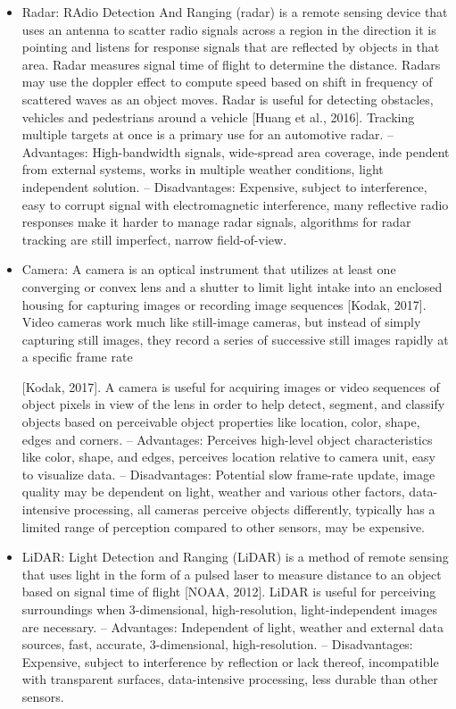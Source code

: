 \begin{itemize}
\item Radar: RAdio Detection And Ranging (radar) is a remote sensing device that uses an antenna to scatter radio signals across a region in the direction it is
pointing and listens for response signals that are reﬂected by objects in that area.
Radar measures signal time of ﬂight to determine the distance. Radars may use
the doppler eﬀect to compute speed based on shift in frequency of scattered
waves as an object moves. Radar is useful for detecting obstacles, vehicles and
pedestrians around a vehicle [Huang et al., 2016]. Tracking multiple targets at
once is a primary use for an automotive radar.
– Advantages: High-bandwidth signals, wide-spread area coverage, inde
pendent from external systems, works in multiple weather conditions, light
independent solution.
– Disadvantages: Expensive, subject to interference, easy to corrupt signal
with electromagnetic interference, many reﬂective radio responses make it
harder to manage radar signals, algorithms for radar tracking are still
imperfect, narrow ﬁeld-of-view.
\item Camera: A camera is an optical instrument that utilizes at least one converging or convex lens and a shutter to limit light intake into an enclosed housing for
capturing images or recording image sequences [Kodak, 2017]. Video cameras
work much like still-image cameras, but instead of simply capturing still images,
they record a series of successive still images rapidly at a speciﬁc frame rate

[Kodak, 2017]. A camera is useful for acquiring images or video sequences of
object pixels in view of the lens in order to help detect, segment, and classify
objects based on perceivable object properties like location, color, shape, edges
and corners.
– Advantages: Perceives high-level object characteristics like color, shape,
and edges, perceives location relative to camera unit, easy to visualize
data.
– Disadvantages: Potential slow frame-rate update, image quality may
be dependent on light, weather and various other factors, data-intensive
processing, all cameras perceive objects diﬀerently, typically has a limited
range of perception compared to other sensors, may be expensive.
 \item LiDAR: Light Detection and Ranging (LiDAR) is a method of remote sensing that uses light in the form of a pulsed laser to measure distance to an object
based on signal time of ﬂight [NOAA, 2012]. LiDAR is useful for perceiving
surroundings when 3-dimensional, high-resolution, light-independent images are
necessary.
– Advantages: Independent of light, weather and external data sources,
fast, accurate, 3-dimensional, high-resolution.
– Disadvantages: Expensive, subject to interference by reﬂection or lack
thereof, incompatible with transparent surfaces, data-intensive processing,
less durable than other sensors.

\end{itemize}

